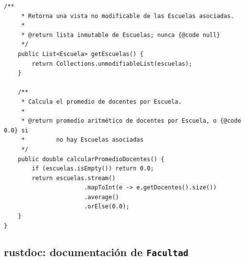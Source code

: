 \begin{lstlisting}[style=javaStyle,
  caption={Documentación Javadoc completa para la clase \texttt{Facultad}.},
  label={lst:javadoc-facultad}]
    /**
     * Retorna una vista no modificable de las Escuelas asociadas.
     *
     * @return lista inmutable de Escuelas; nunca {@code null}
     */
    public List<Escuela> getEscuelas() {
        return Collections.unmodifiableList(escuelas);
    }

    /**
     * Calcula el promedio de docentes por Escuela.
     *
     * @return promedio aritmético de docentes por Escuela, o {@code 0.0} si
     *         no hay Escuelas asociadas
     */
    public double calcularPromedioDocentes() {
        if (escuelas.isEmpty()) return 0.0;
        return escuelas.stream()
                       .mapToInt(e -> e.getDocentes().size())
                       .average()
                       .orElse(0.0);
    }
}
\end{lstlisting}

\subsection{rustdoc: documentación de \texttt{Facultad}}
\label{subsec:rustdoc-facultad}

